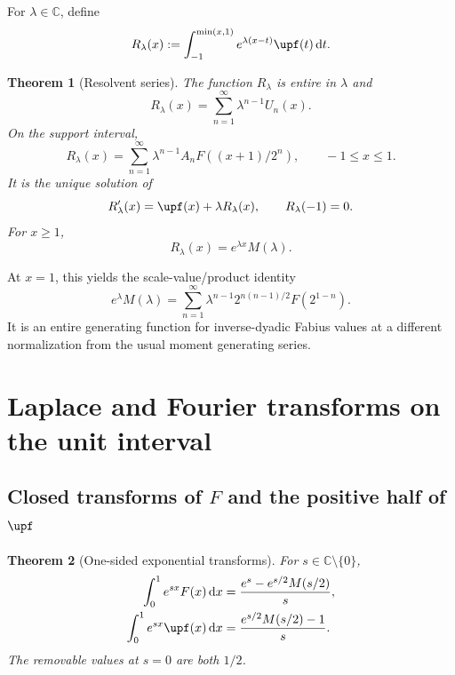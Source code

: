 \documentclass[11pt,oneside]{article}
\newtheorem{theorem}{Theorem}[section]
\theoremstyle{definition}
\theoremstyle{remark}
\newcommand{\C}{\mathbb C}
\newcommand{\dd}{\,\mathrm d}
\newcommand{\1}{\mathbf 1}
\begin{document}
For \(\lambda\in\C\), define
\begin{equation}
 R_\lambda(x):=\int_{-1}^{\min(x,1)}e^{\lambda(x-t)}\upf(t)\dd t. \label{p6:eq:resolvent-def}
\end{equation}

\begin{theorem}[Resolvent series]
\label{p6:thm:resolvent}
The function \(R_\lambda\) is entire in \(\lambda\) and
\begin{equation}
 R_\lambda(x)=\sum_{n=1}^{\infty}\lambda^{n-1}U_n(x).     \label{p6:eq:resolvent-series}
\end{equation}
On the support interval,
\begin{equation}
 R_\lambda(x)=\sum_{n=1}^{\infty}\lambda^{n-1}
 A_nF((x+1)/2^n),\qquad -1\le x\le1.                     \label{p6:eq:resolvent-F-series}
\end{equation}
It is the unique solution of
\begin{equation}
 R_\lambda'(x)=\upf(x)+\lambda R_\lambda(x),\qquad R_\lambda(-1)=0. \label{p6:eq:resolvent-ode}
\end{equation}
For \(x\ge1\),
\begin{equation}
 R_\lambda(x)=e^{\lambda x}M(\lambda).                   \label{p6:eq:resolvent-tail}
\end{equation}
\end{theorem}

At \(x=1\), this yields the scale-value/product identity
\begin{equation}
 e^\lambda M(\lambda)
 =\sum_{n=1}^{\infty}\lambda^{n-1}
   2^{n(n-1)/2}F(2^{1-n}).                                \label{p6:eq:resolvent-product-identity}
\end{equation}
It is an entire generating function for inverse-dyadic Fabius values at a different
normalization from the usual moment generating series.

\section{Laplace and Fourier transforms on the unit interval}

\subsection{Closed transforms of \(F\) and the positive half of \(\upf\)}

\begin{theorem}[One-sided exponential transforms]
\label{p6:thm:one-sided-laplace}
For \(s\in\C\setminus\{0\}\),
\begin{align}
 \int_0^1e^{sx}F(x)\dd x
 &=\frac{e^s-e^{s/2}M(s/2)}{s},                           \label{p6:eq:F-laplace}\\
 \int_0^1e^{sx}\upf(x)\dd x
 &=\frac{e^{s/2}M(s/2)-1}{s}.                             \label{p6:eq:up-half-laplace}
\end{align}
The removable values at \(s=0\) are both \(1/2\).
\end{theorem}
\end{document}
